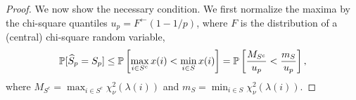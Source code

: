 \begin{proof}
We now show the necessary condition. 
We first normalize the maxima by the chi-square quantiles $u_p = F^{\leftarrow}(1-1/p)$, where $F$ is the distribution of a (central) chi-square random variable,
\begin{equation}
 \P[\widehat{S}_p = S_p] \le \P\left[\max_{i\in S^c}x(i) < \min_{i\in S}x(i)\right]
  = \P\left[ \frac{M_{S^c}}{u_p} < \frac{m_S}{u_p} \right], \label{eq:chi-square-necessary-0}
\end{equation}
where $M_{S^c} = \max_{i\in S^c}\chi_\nu^2(\lambda(i))$ and $m_{S} = \min_{i\in S}\chi_\nu^2(\lambda(i))$.


\end{proof}
